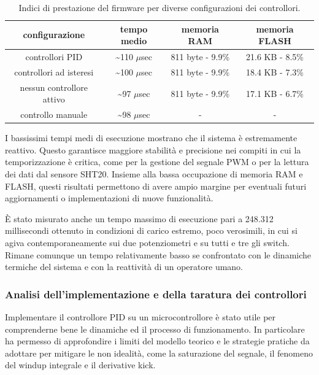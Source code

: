 \begin{table}[htbp]
	\centering
	\begin{tabular}{c | c | c | c}
		\textbf{configurazione} & \textbf{tempo medio} & \textbf{memoria RAM} & \textbf{memoria FLASH} \\
		\toprule
		controllori PID & \textasciitilde 110 \(\mu\)sec & 811 byte - 9.9\% & 21.6 KB - 8.5\% \\
		\midrule
		controllori ad isteresi & \textasciitilde 100 \(\mu\)sec & 811 byte - 9.9\% & 18.4 KB - 7.3\% \\
		\midrule
		nessun controllore attivo & \textasciitilde 97 \(\mu\)sec & 811 byte - 9.9\% & 17.1 KB - 6.7\%\\
		\midrule
		controllo manuale & \textasciitilde 98 \(\mu\)sec & - & - \\
	\end{tabular}
	\caption[Indici di prestazione del firmware]{Indici di prestazione del firmware per diverse configurazioni dei controllori.}
	\label{tab:firmware_performance}
\end{table}

I bassissimi tempi medi di esecuzione mostrano che il sistema è estremamente reattivo. Questo garantisce maggiore stabilità
e precisione nei compiti in cui la temporizzazione è critica, come per la gestione del segnale PWM o per la lettura dei dati
dal sensore SHT20. Insieme alla bassa occupazione di memoria RAM e FLASH, questi risultati permettono di avere ampio margine
per eventuali futuri aggiornamenti o implementazioni di nuove funzionalità.

È stato misurato anche un tempo massimo di esecuzione pari a 248.312 millisecondi ottenuto in condizioni di carico estremo, poco
verosimili, in cui si agiva contemporaneamente sui due potenziometri e su tutti e tre gli switch. Rimane comunque un tempo
relativamente basso se confrontato con le dinamiche termiche del sistema e con la reattività di un operatore umano.

\subsubsection{Analisi dell'implementazione e della taratura dei controllori}
Implementare il controllore PID su un microcontrollore è stato utile per comprenderne bene le dinamiche ed il processo di
funzionamento. In particolare ha permesso di approfondire i limiti del modello teorico e le strategie pratiche da adottare
per mitigare le non idealità, come la saturazione del segnale, il fenomeno del windup integrale e il derivative kick.

